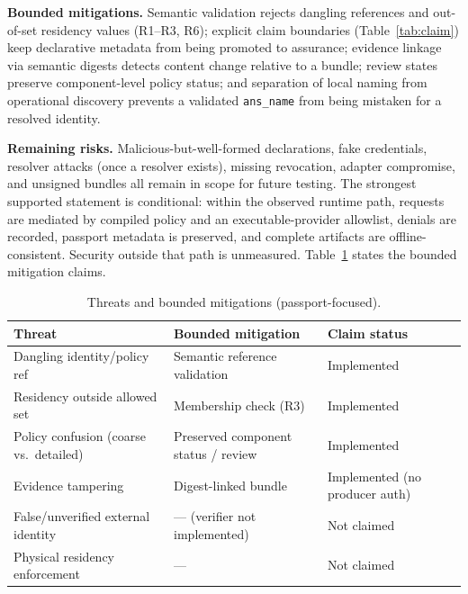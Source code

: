 \documentclass[conference]{IEEEtran}
\newcommand{\code}[1]{\texttt{\small #1}}
\begin{document}
\noindent\textbf{Bounded mitigations.} Semantic validation rejects dangling
references and out-of-set residency values (R1--R3, R6); explicit claim
boundaries (Table~\ref{tab:claim}) keep declarative metadata from being promoted
to assurance; evidence linkage via semantic digests detects content change
relative to a bundle; review states preserve component-level policy status; and
separation of local naming from operational discovery prevents a validated
\code{ans\_name} from being mistaken for a resolved identity.

\noindent\textbf{Remaining risks.} Malicious-but-well-formed declarations, fake
credentials, resolver attacks (once a resolver exists), missing revocation,
adapter compromise, and unsigned bundles all remain in scope for future testing.
The strongest supported statement is conditional: within the observed runtime
path, requests are mediated by compiled policy and an executable-provider
allowlist, denials are recorded, passport metadata is preserved, and complete
artifacts are offline-consistent. Security outside that path is unmeasured.
Table~\ref{tab:threats} states the bounded mitigation claims.

\begin{table}[t]
\centering
\caption{Threats and bounded mitigations (passport-focused).}
\label{tab:threats}
\renewcommand{\arraystretch}{1.2}
\footnotesize
\begin{tabular}{@{}p{}p{}p{}@{}}
\toprule
\textbf{Threat} & \textbf{Bounded mitigation} & \textbf{Claim status} \\
\midrule
Dangling identity/policy ref & Semantic reference validation & Implemented \\
Residency outside allowed set & Membership check (R3) & Implemented \\
Policy confusion (coarse vs.\ detailed) & Preserved component status / review & Implemented \\
Evidence tampering & Digest-linked bundle & Implemented (no producer auth) \\
False/unverified external identity & --- (verifier not implemented) & Not claimed \\
Physical residency enforcement & --- & Not claimed \\
\bottomrule
\end{tabular}
\end{table}
\end{document}
